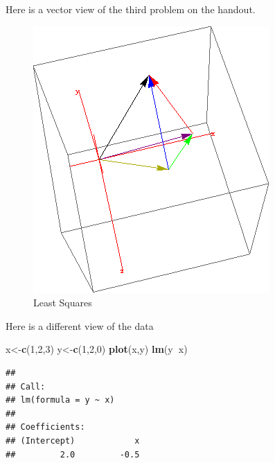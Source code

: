 \documentclass[]{book}
\newenvironment{Shaded}{\begin{snugshade}}{\end{snugshade}}
\newcommand{\KeywordTok}[1]{\textcolor[rgb]{0.13,0.29,0.53}{\textbf{#1}}}
\newcommand{\DataTypeTok}[1]{\textcolor[rgb]{0.13,0.29,0.53}{#1}}
\newcommand{\DecValTok}[1]{\textcolor[rgb]{0.00,0.00,0.81}{#1}}
\newcommand{\StringTok}[1]{\textcolor[rgb]{0.31,0.60,0.02}{#1}}
\newcommand{\OperatorTok}[1]{\textcolor[rgb]{0.81,0.36,0.00}{\textbf{#1}}}
\newcommand{\NormalTok}[1]{#1}
\theoremstyle{definition}
\theoremstyle{definition}
\theoremstyle{definition}
\theoremstyle{remark}
\begin{document}
Here is a vector view of the third problem on the handout.

\begin{figure}
\centering
\includegraphics{./images/LeastSquares.png}
\caption{Least Squares}
\end{figure}

Here is a different view of the data

\begin{Shaded}
\begin{Highlighting}[]
\NormalTok{x<-}\KeywordTok{c}\NormalTok{(}\DecValTok{1}\NormalTok{,}\DecValTok{2}\NormalTok{,}\DecValTok{3}\NormalTok{)}
\NormalTok{y<-}\KeywordTok{c}\NormalTok{(}\DecValTok{1}\NormalTok{,}\DecValTok{2}\NormalTok{,}\DecValTok{0}\NormalTok{)}
\KeywordTok{plot}\NormalTok{(x,y)}
\KeywordTok{lm}\NormalTok{(y}\OperatorTok{~}\NormalTok{x)}
\end{Highlighting}
\end{Shaded}

\begin{verbatim}
## 
## Call:
## lm(formula = y ~ x)
## 
## Coefficients:
## (Intercept)            x  
##         2.0         -0.5
\end{verbatim}

\begin{Shaded}
\end{Shaded}
\end{document}
